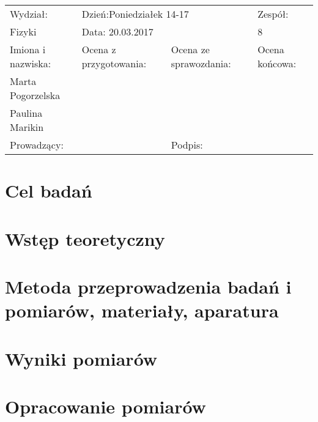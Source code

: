 \documentclass[a4paper,10pt]{article}
\def\arraystretch{1.2}
\begin{document}
\begin{table}
  \centering
  \def\arraystretch{1.5}
    \begin{tabular}{|l|l|l|l|} \hline
    Wydział:           & \multicolumn{2}{l|}{Dzień:Poniedziałek 14-17}    &Zespół:  \\
    Fizyki             &    \multicolumn{2}{l|}{Data: 20.03.2017}         &8             \\\hline
    Imiona i nazwiska: &Ocena z przygotowania:  &Ocena ze sprawozdania:   &Ocena końcowa: \\
    Marta Pogorzelska  &                        &                         &                \\
    Paulina Marikin    &                        &                         &\\\hline
    \multicolumn{2}{|l|}{Prowadzący:                 } &\multicolumn{2}{l|}{Podpis:             }  \\\hline
  \end{tabular}
\end{table}

\section{Cel badań}

\section{Wstęp teoretyczny}

\section{Metoda przeprowadzenia badań i pomiarów, materiały, aparatura}

\section{Wyniki pomiarów}

\section{Opracowanie pomiarów}
\end{document}
